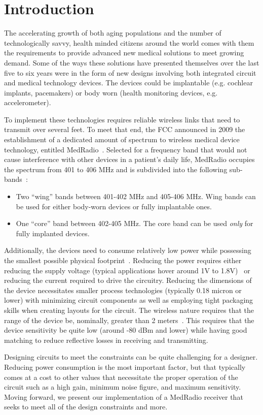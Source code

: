 \section{Introduction}
The accelerating growth of both aging populations and the number of technologically savvy, health minded citizens around the world comes with them the requirements to provide advanced new medical solutions to meet growing demand. Some of the ways these solutions have presented themselves over the last five to six years were in the form of new designs involving both integrated circuit and medical technology devices. The devices could be implantable (e.g. cochlear implants, pacemakers) or body worn (health monitoring devices, e.g. accelerometer). 

To implement these technologies requires reliable wireless links that need to transmit over several feet. To meet that end, the FCC announced in 2009 the establishment of a dedicated amount of spectrum to wireless medical device technology, entitled MedRadio~\cite{fcc}. Selected for a frequency band that would not cause interference with other devices in a patient's daily life, MedRadio occupies the spectrum from 401 to 406 MHz and is subdivided into the following sub-bands~\cite{cha1, fcc}:
\begin{itemize}
	\item Two ``wing'' bands between 401-402 MHz and 405-406 MHz. Wing bands can be used for either body-worn devices or fully implantable ones.
	\item One ``core'' band between 402-405 MHz. The core band can be used \emph{only} for fully implanted devices.
\end{itemize}

Additionally, the devices need to consume relatively low power while possessing the smallest possible physical footprint~\cite{Bradley}. Reducing the power requires either reducing the supply voltage (typical applications hover around 1V to 1.8V)~\cite{Bradley} or reducing the current required to drive the circuitry. Reducing the dimensions of the device necessitates smaller process technologies (typically 0.18 micron or lower) with minimizing circuit components as well as employing tight packaging skills when creating layouts for the circuit. The wireless nature requires that the range of the device be, nominally, greater than 2 meters~\cite{Bradley}. This requires that the device sensitivity be quite low (around -80 dBm and lower) while having good matching to reduce reflective losses in receiving and transmitting.

Designing circuits to meet the constraints can be quite challenging for a designer. Reducing power consumption is the most important factor, but that typically comes at a cost to other values that necessitate the proper operation of the circuit such as a high gain, minimum noise figure, and maximum sensitivity. Moving forward, we present our implementation of a MedRadio receiver that seeks to meet all of the design constraints and more.
